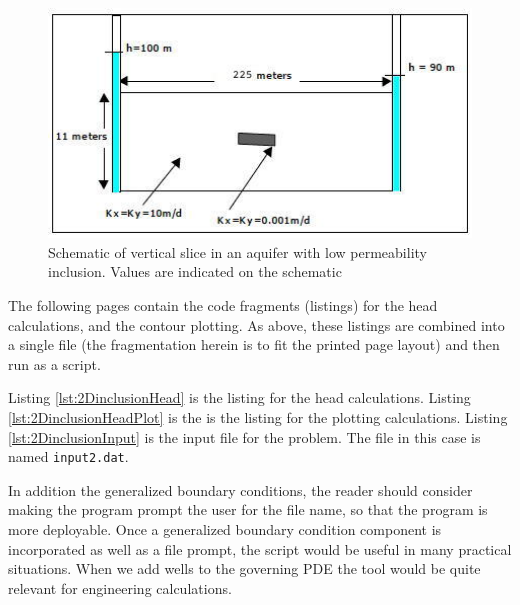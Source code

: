 \begin{figure}[h!] %
   \centering
   \includegraphics[width=4.5in]{./17-SteadyGroundwaterFlow/aquifer-2d-lowKinclusion.jpg} 
   \caption{Schematic of vertical slice in an aquifer with low permeability inclusion.  Values are indicated on the schematic }
   \label{fig:aquifer-2d-lowKinclusion}
\end{figure}

The following pages contain the code fragments (listings) for the head calculations, and the contour plotting.  As above, these listings are combined into a single file (the fragmentation herein is to fit the printed page layout) and then run as a script. 

Listing \ref{lst:2DinclusionHead} is the listing for the head calculations.  
Listing \ref{lst:2DinclusionHeadPlot} is the is the listing for the plotting calculations.
Listing \ref{lst:2DinclusionInput} is the input file for the problem.  
The file in this case is named \texttt{input2.dat}.  

In addition the generalized boundary conditions, the reader should consider making the program prompt the user for the file name, so that the program is more deployable.
Once a generalized boundary condition component is incorporated as well as a file prompt, the script would be useful in many practical situations.   
When we add wells to the governing PDE the tool would be quite relevant for engineering calculations.
\clearpage

